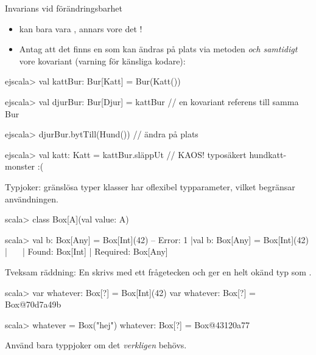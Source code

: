\begin{Slide}{Invarians vid förändringsbarhet}
\begin{itemize}\SlideFontSmall

\item {} kan bara vara , annars vore det !
\item Antag att det finns en  som kan ändras på plats via metoden  \emph{och samtidigt} vore kovariant (varning för känsliga kodare): 
\end{itemize}

\begin{REPLsmall}
ejscala> val kattBur: Bur[Katt] = Bur(Katt())

ejscala> val djurBur: Bur[Djur] = kattBur  // en kovariant referens till samma Bur

ejscala> djurBur.bytTill(Hund())           // ändra på plats

ejscala> val katt: Katt = kattBur.släppUt  // KAOS! typosäkert hundkatt-monster :(
\end{REPLsmall}

\end{Slide}


\begin{Slide}{Typjoker: gränslösa typer}\SlideFontSmall
{} klasser har oflexibel typparameter, vilket begränsar användningen. %
\begin{REPL}
scala> class Box[A](val value: A)

scala> val b: Box[Any] = Box[Int](42)
-- Error:
1 |val b: Box[Any] = Box[Int](42)
  |                  ^^^^^^^^^^^^
  |                  Found:    Box[Int]
  |                  Required: Box[Any]
\end{REPL}  
Tveksam räddning: En   skrivs med ett frågetecken och ger en helt okänd typ  som .
\begin{REPL}
scala> var whatever: Box[?] = Box[Int](42)
var whatever: Box[?] = Box@70d7a49b
                                                                                    
scala> whatever = Box("hej")
whatever: Box[?] = Box@43120a77
\end{REPL}
Använd bara typpjoker om det \emph{verkligen} behövs.
\end{Slide}


